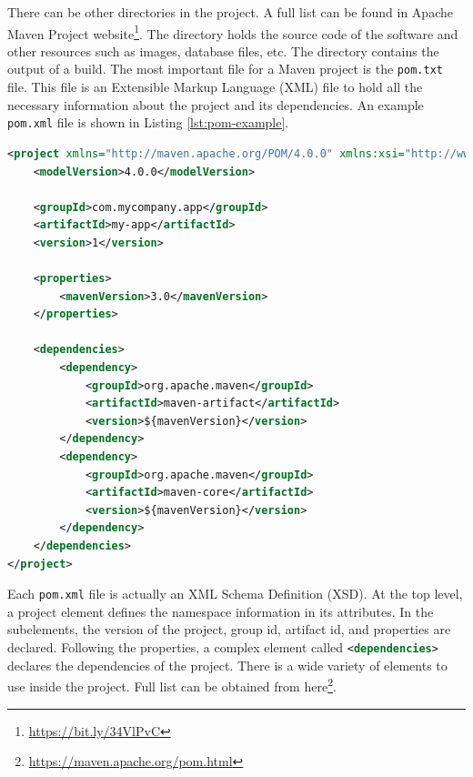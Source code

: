 There can be other directories in the project. A full list can be found in Apache Maven Project website\footnote{\url{https://bit.ly/34VlPvC}}. The  directory holds the source code of the software and other resources such as images, database files, etc. The  directory contains the output of a build. The most important file for a Maven project is the \lstinline[language={}]|pom.txt| file. This file is an Extensible Markup Language (XML) file to hold all the necessary information about the project and its dependencies. An example \lstinline[language={}]|pom.xml| file is shown in Listing \ref{lst:pom-example}.

\begin{lstlisting}[language=XML,caption={An example pom.xml file.},label=lst:pom-example]
<project xmlns="http://maven.apache.org/POM/4.0.0" xmlns:xsi="http://www.w3.org/2001/XMLSchema-instance" xsi:schemaLocation="http://maven.apache.org/POM/4.0.0 http://maven.apache.org/xsd/maven-4.0.0.xsd">
    <modelVersion>4.0.0</modelVersion>
 
    <groupId>com.mycompany.app</groupId>
    <artifactId>my-app</artifactId>
    <version>1</version>
    
    <properties>
        <mavenVersion>3.0</mavenVersion>
    </properties>
 
    <dependencies>
        <dependency>
            <groupId>org.apache.maven</groupId>
            <artifactId>maven-artifact</artifactId>
            <version>${mavenVersion}</version>
        </dependency>
        <dependency>
            <groupId>org.apache.maven</groupId>
            <artifactId>maven-core</artifactId>
            <version>${mavenVersion}</version>
        </dependency>
    </dependencies>
</project>
\end{lstlisting}

Each \lstinline[language={}]|pom.xml| file is actually an XML Schema Definition (XSD). At the top level, a project element defines the namespace information in its attributes. In the subelements, the version of the project, group id, artifact id, and properties are declared. Following the properties, a complex element called \lstinline[language={XML}]|<dependencies>| declares the dependencies of the project. There is a wide variety of elements to use inside the project. Full list can be obtained from here\footnote{\url{https://maven.apache.org/pom.html}}.

